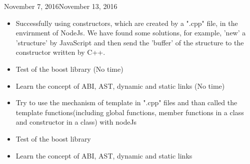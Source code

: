 \begin{fichesuivi}{November 7, 2016}{November 13, 2016}

   \begin{travaileffectue}
      \begin{itemize}
             \item Successfully using constructors, which are created by a ".cpp" file, in the envirnment of NodeJs.  We have found some solutions, for example, 'new' a 'structure' by JavaScript and then send the 'buffer' of the structure to the constructor written by C++.
     \end{itemize}
   \end{travaileffectue}

   \begin{travailnoneffectue}
     \begin{itemize}
         \item Test of the boost library (No time)
         \item Learn the concept of ABI, AST, dynamic and static links (No time)
       \end{itemize}
   \end{travailnoneffectue}

   \begin{planification}
        \begin{itemize}
         \item Try to use the mechanism of template in ".cpp" files and than called the template functions(including global functions, member functions in a class and constructor in a class) with nodeJs
         \item Test of the boost library 
         \item Learn the concept of ABI, AST, dynamic and static links 
       \end{itemize}
   \end{planification}
   
\end{fichesuivi}




